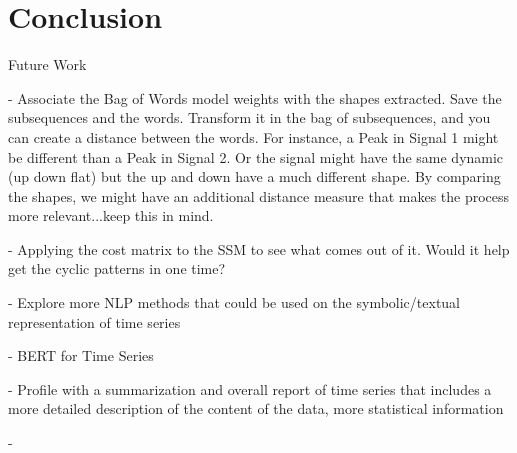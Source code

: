 
%

\chapter{Conclusion}
\label{cha:Conclusion}



Future Work

- Associate the Bag of Words model weights with the shapes extracted. Save the subsequences and the words. Transform it in the bag of subsequences, and you can create a distance between the words. For instance, a Peak in Signal 1 might be different than a Peak in Signal 2. Or the signal might have the same dynamic (up down flat) but the up and down have a much different shape. By comparing the shapes, we might have an additional distance measure that makes the process more relevant...keep this in mind.

- Applying the cost matrix to the SSM to see what comes out of it. Would it help get the cyclic patterns in one time?

- Explore more NLP methods that could be used on the symbolic/textual representation of time series

- BERT for Time Series

- Profile with a summarization and overall report of time series that includes a more detailed description of the content of the data, more statistical information

- 